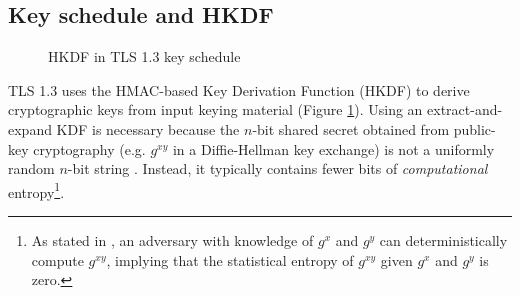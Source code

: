 \documentclass[letterpaper,12pt,titlepage,oneside,final]{book}
\begin{document}
\subsection{Key schedule and HKDF}\label{sec:tls13-key-schedule}
\begin{figure}[htbp]
    \centering
    \caption{HKDF in TLS 1.3 key schedule}
    \label{fig:tls13-key-schedule}
\end{figure}

TLS 1.3 uses the HMAC-based Key Derivation Function (HKDF) \cite{DBLP:journals/rfc/rfc5869} to derive cryptographic keys from input keying material (Figure \ref{fig:tls13-key-schedule}).
Using an extract-and-expand KDF is necessary because the $n$-bit shared secret obtained from public-key cryptography (e.g. $g^{xy}$ in a Diffie-Hellman key exchange) is not a uniformly random $n$-bit string \cite{DBLP:conf/crypto/Krawczyk10}. 
Instead, it typically contains fewer bits of {\it computational} entropy\footnote{\scriptsize As stated in \cite{DBLP:conf/crypto/Krawczyk10}, an adversary with knowledge of $g^x$ and $g^y$ can deterministically compute $g^{xy}$, implying that the statistical entropy of $g^{xy}$ given $g^x$ and $g^y$ is zero.}.
\end{document}
